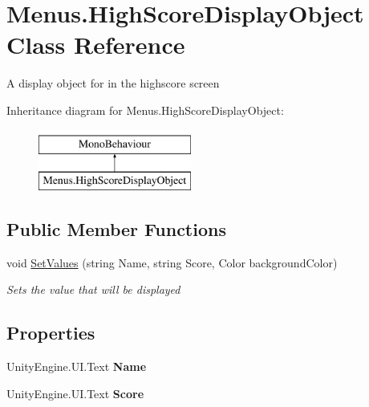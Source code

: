 \hypertarget{class_menus_1_1_high_score_display_object}{}\section{Menus.\+High\+Score\+Display\+Object Class Reference}
\label{class_menus_1_1_high_score_display_object}


A display object for in the highscore screen  


Inheritance diagram for Menus.\+High\+Score\+Display\+Object\+:\begin{figure}[H]
\begin{center}
\leavevmode
\includegraphics[height=2.000000cm]{class_menus_1_1_high_score_display_object}
\end{center}
\end{figure}
\subsection*{Public Member Functions}
\begin{DoxyCompactItemize}
\item 
void \hyperlink{class_menus_1_1_high_score_display_object_a4826d2032c3e4745c7f775335574fabd}{Set\+Values} (string Name, string Score, Color background\+Color)
\begin{DoxyCompactList}\small\item\em Sets the value that will be displayed \end{DoxyCompactList}\end{DoxyCompactItemize}
\subsection*{Properties}
\begin{DoxyCompactItemize}
\item 
Unity\+Engine.\+U\+I.\+Text {\bfseries Name}\hypertarget{class_menus_1_1_high_score_display_object_a6f5e66f0fb2cedc20f3665d91eb32a14}{}\label{class_menus_1_1_high_score_display_object_a6f5e66f0fb2cedc20f3665d91eb32a14}

\item 
Unity\+Engine.\+U\+I.\+Text {\bfseries Score}\hypertarget{class_menus_1_1_high_score_display_object_ac75150470bff753ad209980ca41744d3}{}\label{class_menus_1_1_high_score_display_object_ac75150470bff753ad209980ca41744d3}

\end{DoxyCompactItemize}


